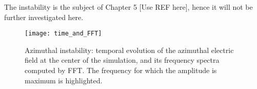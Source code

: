   The instability is the subject of Chapter 5 [Use REF here], hence it will not be further investigated here.
  
  
  \begin{figure}[hbtp]
    \centering
    \texttt{[image: time\_and\_FFT]}
    \caption{Azimuthal instability\string: temporal evolution of the azimuthal electric field at the center of the simulation, and its frequency spectra computed by \ac{FFT}. The frequency for which the amplitude is maximum is highlighted.}
    \label{fig-exampleECDI}
  \end{figure}

  
  